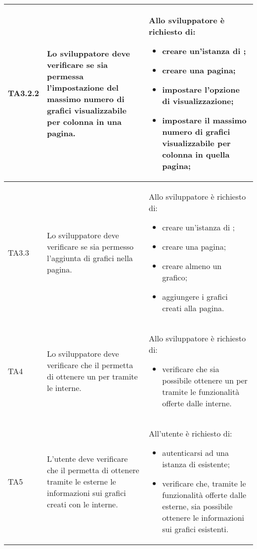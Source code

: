 \begin{longtabu}{| X[0.5] | X | X |}
	TA3.2.2 & Lo sviluppatore deve verificare se sia permessa l'impostazione del massimo numero di grafici visualizzabile per colonna in una pagina.
		
		& Allo sviluppatore è richiesto di:
		\begin{itemize}
			\item creare un'istanza di \projectname{};
			\item creare una pagina;
			\item impostare l'opzione di visualizzazione;
			\item impostare il massimo numero di grafici visualizzabile per colonna in quella pagina;
		\end{itemize}
\\ \hline

	TA3.3 & Lo sviluppatore deve verificare se sia permesso l'aggiunta di grafici nella pagina.
		
		& Allo sviluppatore è richiesto di:
		\begin{itemize}
			\item creare un'istanza di \projectname{};
			\item creare una pagina;
			\item creare almeno un grafico;
			\item aggiungere i grafici creati alla pagina.
		\end{itemize}
\\ \hline

	TA4 & Lo sviluppatore deve verificare che il  permetta di ottenere un  per  tramite le  interne.
		
		& Allo sviluppatore è richiesto di:
		\begin{itemize}
			\item verificare che sia possibile ottenere un  per  tramite le funzionalità offerte dalle  interne.
		\end{itemize}
\\ \hline

	TA5 & L'utente  deve verificare che il  permetta di ottenere tramite le  esterne le informazioni sui grafici creati con le  interne.

		& All'utente  è richiesto di:
		\begin{itemize}
			\item autenticarsi ad una istanza di \projectname{} esistente;
			\item verificare che, tramite le funzionalità offerte dalle  esterne, sia possibile ottenere le informazioni sui grafici esistenti.
		\end{itemize}
\\ \hline


\end{longtabu}
